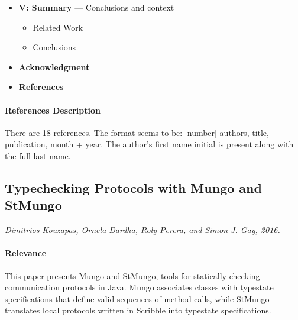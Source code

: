\documentclass{article}
\begin{document}
\begin{itemize}
    \item \textbf{V: Summary} --- Conclusions and context
    \begin{itemize}
        \item Related Work
        \item Conclusions
    \end{itemize}

    \item \textbf{Acknowledgment}

    \item \textbf{References}
\end{itemize}

\paragraph{References Description}
There are 18 references. The format seems to be: [number] authors, title, publication, month + year. 
The author's first name initial is present along with the full last name.


\subsection{Typechecking Protocols with Mungo and StMungo}
\textit{Dimitrios Kouzapas, Ornela Dardha, Roly Perera, and Simon J. Gay, 2016.}~\cite{kouzapas-et-al-2016}

\paragraph{Relevance}
This paper presents Mungo and StMungo, tools for statically checking communication protocols in Java. Mungo associates classes with typestate specifications that define valid sequences of method calls, while StMungo translates local protocols written in Scribble into typestate specifications.
\end{document}
